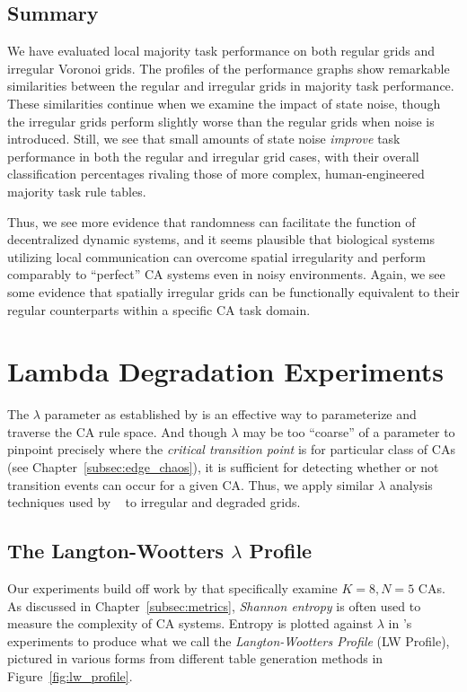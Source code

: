 \documentclass[a4paper,11pt]{article}
\begin{document}
\subsection{Summary}
We have evaluated local majority task performance on both regular grids and irregular Voronoi grids. The profiles of the performance graphs show remarkable similarities between the regular and irregular grids in majority task performance. These similarities continue when we examine the impact of state noise, though the irregular grids perform slightly worse than the regular grids when noise is introduced. Still, we see that small amounts of state noise \textit{improve} task performance in both the regular and irregular grid cases, with their overall classification percentages rivaling those of more complex, human-engineered majority task rule tables.

Thus, we see more evidence that randomness can facilitate the function of decentralized dynamic systems, and it seems plausible that biological systems utilizing local communication can overcome spatial irregularity and perform comparably to ``perfect'' CA systems even in noisy environments. Again, we see some evidence that spatially irregular grids can be functionally equivalent to their regular counterparts within a specific CA task domain.


\section{Lambda Degradation Experiments}
\label{sec:lambda_degen}
The $\lambda$ parameter as established by \citeauthor{la90} is an effective way to parameterize and traverse the CA rule space. And though $\lambda$ may be too ``coarse'' of a parameter to pinpoint precisely where the \textit{critical transition point} is for particular class of CAs (see Chapter~\ref{subsec:edge_chaos}), it is sufficient for detecting whether or not transition events can occur for a given CA. Thus, we apply similar $\lambda$ analysis techniques used by \citeauthor{wo90}~\cite{la90,wo90} to irregular and degraded grids.

\subsection{The Langton-Wootters $\lambda$ Profile}
Our experiments build off work by \citeauthor{wo90} that specifically examine $K=8, N=5$ CAs. As discussed in Chapter~\ref{subsec:metrics}, \textit{Shannon entropy} is often used to measure the complexity of CA systems. Entropy is plotted against $\lambda$ in \citeauthor{wo90}'s experiments to produce what we call the \textit{Langton-Wootters Profile} (LW Profile), pictured in various forms from different table generation methods in Figure~\ref{fig:lw_profile}.
\end{document}
